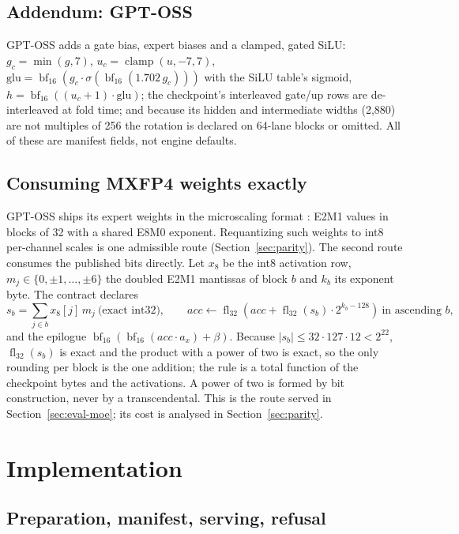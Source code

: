 \documentclass{article}
\newcommand{\fl}{\operatorname{fl}_{32}}
\newcommand{\bfround}{\operatorname{bf}_{16}}
\begin{document}
\subsection{Addendum: GPT-OSS}

GPT-OSS \cite{gptoss2025} adds a gate bias, expert biases and a clamped, gated SiLU:
$g_c=\min(g,7)$, $u_c=\operatorname{clamp}(u,-7,7)$,
$\mathrm{glu}=\bfround(g_c\cdot\sigma(\bfround(1.702\,g_c)))$ with the SiLU table's sigmoid,
$h=\bfround((u_c+1)\cdot\mathrm{glu})$; the checkpoint's interleaved gate/up rows are
de-interleaved at fold time; and because its hidden and intermediate widths (2,880) are not
multiples of 256 the rotation is declared on 64-lane blocks or omitted.  All of these are
manifest fields, not engine defaults.

\subsection{Consuming MXFP4 weights exactly}
\label{sec:mx}

GPT-OSS ships its expert weights in the microscaling format \cite{mxfp4}: E2M1 values in
blocks of 32 with a shared E8M0 exponent.  Requantizing such weights to int8 per-channel
scales is one admissible route (Section~\ref{sec:parity}).  The second route consumes the
published bits directly.  Let $x_8$ be the int8 activation row, $m_j\in\{0,\pm1,\ldots,\pm6\}$
the doubled E2M1 mantissas of block $b$ and $k_b$ its exponent byte.  The contract declares
\begin{equation}
  s_b=\sum_{j\in b}x_8[j]\,m_j\ \text{(exact int32)},\qquad
  acc\leftarrow\fl\!\left(acc+\fl(s_b)\cdot2^{k_b-128}\right)\ \text{in ascending }b,
  \label{eq:mx}
\end{equation}
and the epilogue $\bfround(\bfround(acc\cdot a_x)+\beta)$.  Because $|s_b|\leq32\cdot127\cdot
12<2^{22}$, $\fl(s_b)$ is exact and the product with a power of two is exact, so the only
rounding per block is the one addition; the rule is a total function of the checkpoint bytes
and the activations.  A power of two is formed by bit construction, never by a
transcendental.  This is the route served in Section~\ref{sec:eval-moe}; its cost is
analysed in Section~\ref{sec:parity}.

\section{Implementation}
\label{sec:system}

\subsection{Preparation, manifest, serving, refusal}
\end{document}
